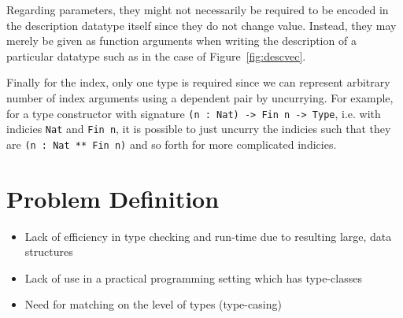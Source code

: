 \documentclass{ituthesis}
\begin{document}
Regarding parameters, they might not necessarily be required to be encoded in the description datatype itself since they do not change value.
Instead, they may merely be given as function arguments when writing the description of a particular datatype such as in the case of Figure~\ref{fig:descvec}.

Finally for the index, only one type is required since we can represent arbitrary number of index arguments using a dependent pair by uncurrying. For example, for a type constructor with signature
\texttt{(n : Nat) -> Fin n -> Type}, i.e. with indicies \texttt{Nat} and \texttt{Fin n}, it is possible to just uncurry the indicies such that they are \texttt{(n : Nat ** Fin n)} and so forth for more complicated indicies.



\section{Problem Definition}
\label{sec:ProblemDefinition}
\begin{itemize}
  \item Lack of efficiency in type checking and run-time due to resulting large, data structures
  \item Lack of use in a practical programming setting which has type-classes
  \item Need for matching on the level of types (type-casing)
\end{itemize}
\end{document}
